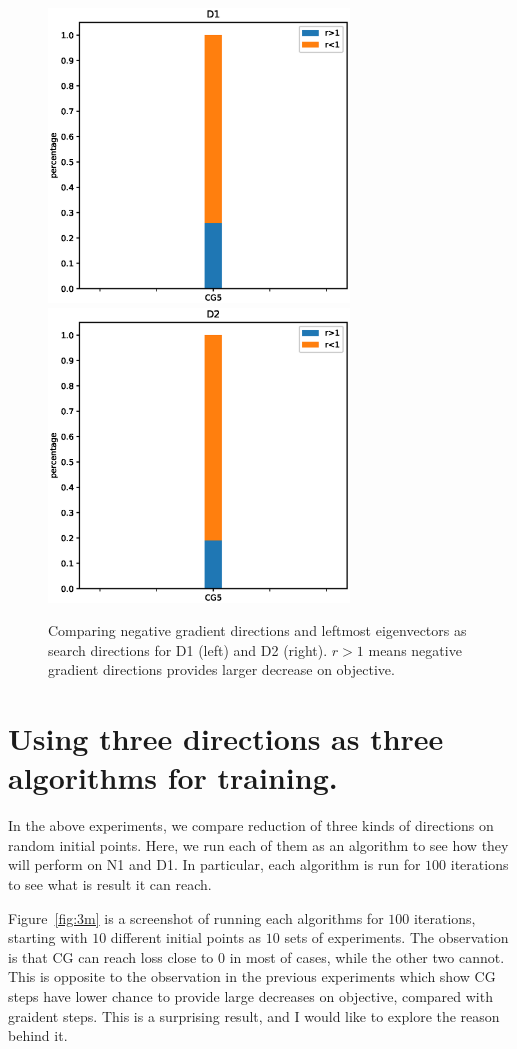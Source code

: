 \documentclass[12pt]{article}
\begin{document}
\begin{figure}[h]
\includegraphics[width=8cm]{ncd1.eps}
\includegraphics[width=8cm]{ncd2.eps}
\caption{Comparing negative gradient directions and leftmost eigenvectors as search directions for D1 (left) and D2 (right).  $r>1$ means negative gradient directions provides larger decrease on objective.}
\label{fig:CGvsGD}
\end{figure}


\section{Using three directions as three algorithms for training.}

In the above experiments, we compare reduction of three kinds of directions on random initial points. Here, we run each of them as an algorithm to see how they will perform on N1 and D1. In particular, each algorithm is run for $100$ iterations to see what is result it can reach.


Figure~\ref{fig:3m} is a screenshot of running each algorithms for $100$ iterations, starting with $10$ different initial points as $10$ sets of experiments. The observation is that CG can reach loss close to $0$ in most of cases, while the other two cannot. This is opposite to the observation in the previous experiments which show CG steps have lower chance to provide large decreases on objective, compared with graident steps. This is a surprising result, and I would like to explore the reason behind it.
\end{document}
